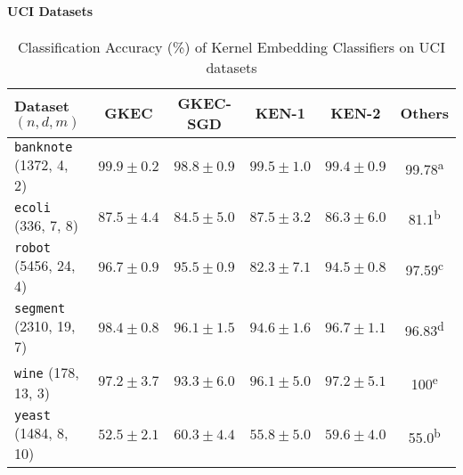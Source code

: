 \documentclass{article}
\begin{document}
	\paragraph{UCI Datasets}
	
		\begin{table}[t]
			\caption{Classification Accuracy (\%) of Kernel Embedding Classifiers on UCI datasets}
			\label{tab:uci_experiments}
			\centering
			\begin{tabular}{lccccc}			
				Dataset \hspace{\fill} $(n, d, m)$ & GKEC & GKEC-SGD & KEN-1 & KEN-2 & Others \\
				\midrule
				\texttt{banknote} \hspace{\fill} (1372, 4, 2) & $99.9 \pm 0.2$ & $98.8 \pm 0.9$ & $99.5 \pm 1.0$ & $99.4 \pm 0.9$ & 99.78\textsuperscript{a} \\
				\texttt{ecoli} \hspace{\fill} (336, 7, 8) & $87.5 \pm 4.4$ & $84.5 \pm 5.0$ & $87.5 \pm 3.2$ & $86.3 \pm 6.0$ & 81.1\textsuperscript{b} \\
				\texttt{robot} \hspace{\fill} (5456, 24, 4) & $96.7 \pm 0.9$ & $95.5 \pm 0.9$ & $82.3 \pm 7.1$ & $94.5 \pm 0.8$ & 97.59\textsuperscript{c} \\
				\texttt{segment} \hspace{\fill} (2310, 19, 7) & $98.4 \pm 0.8$ & $96.1 \pm 1.5$ & $94.6 \pm 1.6$ & $96.7 \pm 1.1$ & 96.83\textsuperscript{d} \\
				\texttt{wine} \hspace{\fill} (178, 13, 3) & $97.2 \pm 3.7$ & $93.3 \pm 6.0$ & $96.1 \pm 5.0$ & $97.2 \pm 5.1$ & 100\textsuperscript{e} \\
				\texttt{yeast} \hspace{\fill} (1484, 8, 10) & $52.5 \pm 2.1$ & $60.3 \pm 4.4$ & $55.8 \pm 5.0$ & $59.6 \pm 4.0$ & 55.0\textsuperscript{b} \\
			\end{tabular}
		\end{table}
		
\end{document}
